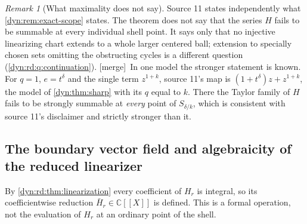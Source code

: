 \documentclass[11pt,letterpaper]{article}
\theoremstyle{definition}
\theoremstyle{remark}
\newtheorem{remark}[remark]{Remark}
\newcommand{\C}{\mathbb C}
\newcommand{\mergetag}{\textup{\textsf{\small[merge]}}}%
\numberwithin{equation}{section}
\begin{document}
\begin{remark}[What maximality does not say]\label{dyn:rd:rem:scope}
Source 11 states independently what \cref{dyn:rem:exact-scope} states. The
theorem does not say that the series $H$ fails to be summable at every
individual shell point. It says only that no injective linearizing chart
extends to a whole larger centered ball; extension to specially chosen sets
omitting the obstructing cycles is a different question
(\cref{dyn:rd:q:continuation}). \mergetag\ In one model the stronger
statement is known. For $q=1$, $e=t^{\delta}$ and the single term $z^{1+k}$,
source 11's map is $(1+t^{\delta})z+z^{1+k}$, the model of
\cref{dyn:thm:sharp} with its $q$ equal to $k$. There the Taylor family of
$H$ fails to be strongly summable at \emph{every} point of
$S_{\delta/k}$, which is consistent with source 11's disclaimer and
strictly stronger than it.
\end{remark}

\subsection{The boundary vector field and algebraicity of the reduced
linearizer}\label{dyn:rd:subsec:reduction}

By \cref{dyn:rd:thm:linearization} every coefficient of $H_r$ is integral,
so its coefficientwise reduction $\bar H_r\in\C[[X]]$ is defined. This is a
formal operation, not the evaluation of $H_r$ at an ordinary point of the
shell.
\end{document}

